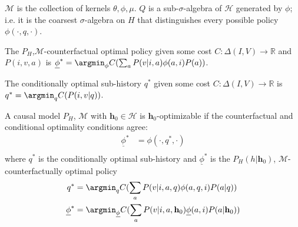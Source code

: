 $\mathscr{M}$ is the collection of kernels $\theta,\phi,\mu$. $Q$ is a sub-$\sigma$-algebra of $\mathcal{H}$ generated by $\phi$; i.e. it is the coarsest $\sigma$-algebra on $H$ that distinguishes every possible policy $\phi(\cdot,q,\cdot)$.

\begin{definition}
The $P_H$,$\mathscr{M}$-counterfactual optimal policy given some cost $C:\Delta(I,V)\to \mathbb{R}$ and $P(i,v,a)$ is $\underline{\phi}^* = \argmin_\phi C(\sum_a P(v|i,a)\phi(a,i)P(a))$.
\end{definition}

\begin{definition}
The conditionally optimal sub-history $q^*$ given some cost $C:\Delta(I,V)\to \mathbb{R}$ is $q^*=\argmin_q C(P(i,v|q))$.
\end{definition}

\begin{definition}
A causal model $P_H$, $\mathscr{M}$ with $\mathbf{h}_0\in\mathcal{H}$ is $\mathbf{h}_0$-optimizable if the counterfactual and conditional optimality conditions agree:
\begin{align}
    \underline{\phi}^* &= \phi(\cdot,q^*,\cdot)\\
\end{align}
where $q^*$ is the conditionally optimal sub-history and $\underline{\phi}^*$ is the $P_H(h|\mathbf{h}_0)$, $\mathscr{M}$-counterfactually optimal policy
\begin{align}
    q^* &= \argmin_q C(\sum_a P(v|i,a,q)\phi(a,q,i)P(a|q))\\
    \underline{\phi}^* &= \argmin_{\underline{\phi}} C(\sum_a P(v|i,a,\mathbf{h}_0)\underline{\phi}(a,i)P(a|\mathbf{h}_0))
\end{align}
\end{definition}


